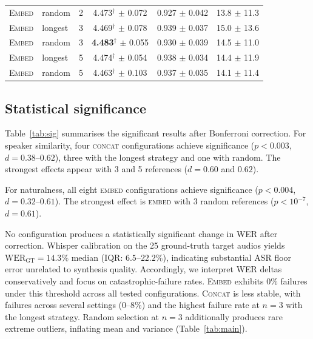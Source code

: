\documentclass{Interspeech}
\begin{document}
\begin{table}[t]
\begin{tabular}{llcccc}
\textsc{Embed} & random  & 2 & 4.473$^\dagger$ \scriptsize{$\pm$ 0.072} & 0.927 \scriptsize{$\pm$ 0.042} & 13.8 \scriptsize{$\pm$ 11.3} \\
\textsc{Embed} & longest & 3 & 4.469$^\dagger$ \scriptsize{$\pm$ 0.078} & 0.939 \scriptsize{$\pm$ 0.037} & 15.0 \scriptsize{$\pm$ 13.6} \\
\textsc{Embed} & random  & 3 & \textbf{4.483}$^\dagger$ \scriptsize{$\pm$ 0.055} & 0.930 \scriptsize{$\pm$ 0.039} & 14.5 \scriptsize{$\pm$ 11.0} \\
\textsc{Embed} & longest & 5 & 4.474$^\dagger$ \scriptsize{$\pm$ 0.054} & 0.938 \scriptsize{$\pm$ 0.034} & 14.4 \scriptsize{$\pm$ 11.9} \\
\textsc{Embed} & random  & 5 & 4.463$^\dagger$ \scriptsize{$\pm$ 0.103} & 0.937 \scriptsize{$\pm$ 0.035} & 14.1 \scriptsize{$\pm$ 11.4} \\
\bottomrule
\end{tabular}
\end{table}

\subsection{Statistical significance}
\label{sec:significance}

Table~\ref{tab:sig} summarises the significant results after Bonferroni correction.
For speaker similarity, four \textsc{concat} configurations achieve significance ($p < 0.003$, $d = 0.38$--$0.62$), three with the longest strategy and one with random.
The strongest effects appear with 3 and 5 references ($d = 0.60$ and $0.62$).

For naturalness, all eight \textsc{embed} configurations achieve significance ($p < 0.004$, $d = 0.32$--$0.61$).
The strongest effect is \textsc{embed} with 3 random references ($p < 10^{-7}$, $d = 0.61$).

No configuration produces a statistically significant change in WER after correction.
Whisper calibration on the 25 ground-truth target audios yields $\mathrm{WER}_{\text{GT}}=14.3\%$ median (IQR: $6.5$--$22.2\%$), indicating substantial ASR floor error unrelated to synthesis quality.
Accordingly, we interpret WER deltas conservatively and focus on catastrophic-failure rates.
\textsc{Embed} exhibits 0\% failures under this threshold across all tested configurations.
\textsc{Concat} is less stable, with failures across several settings (0--8\%) and the highest failure rate at $n{=}3$ with the longest strategy.
Random selection at $n{=}3$ additionally produces rare extreme outliers, inflating mean and variance (Table~\ref{tab:main}).
\end{document}
